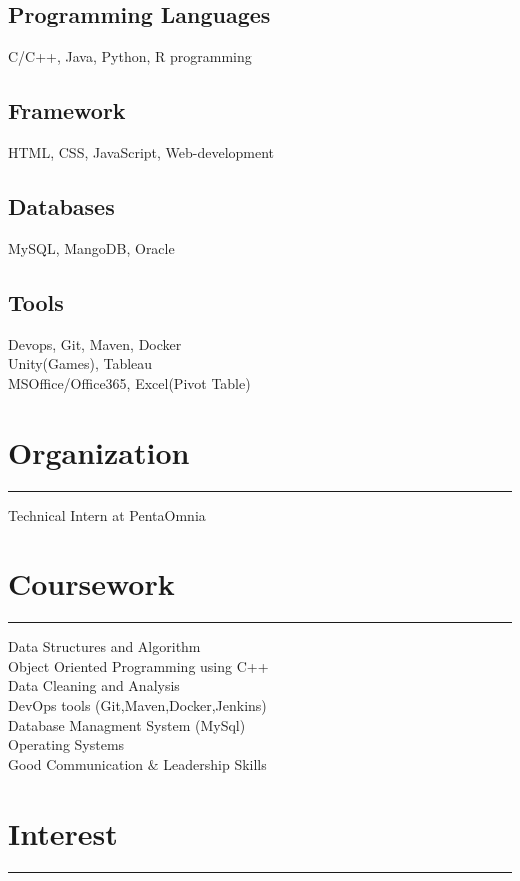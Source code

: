 \documentclass[]{vishal-kathpalia}
\begin{document}
\begin{minipage}[t]{0.33\textwidth}
\subsection{Programming Languages}
C/C++, Java, Python, R programming
\vspace{4pt}
\subsection{Framework}
HTML, CSS, JavaScript,
Web-development
\vspace{4pt}
\subsection{Databases}
MySQL, MangoDB, Oracle
\vspace{4pt}
\subsection{Tools}
Devops, Git, Maven, Docker \\Unity(Games), Tableau\\
MSOffice/Office365, Excel(Pivot Table) \\
\sectionsep
\section{Organization}
\noindent\rule{5cm}{0.4pt}

Technical Intern at PentaOmnia
\section{Coursework}
\noindent\rule{5cm}{0.4pt}

Data Structures and Algorithm\\
Object Oriented Programming using C++\\
Data Cleaning and Analysis\\
DevOps tools (Git,Maven,Docker,Jenkins)\\
Database Managment System (MySql)\\
Operating Systems\\
Good Communication $\&$ Leadership Skills
\sectionsep
\section{Interest}
\noindent\rule{5cm}{0.4pt}


\end{minipage}
\end{document}
